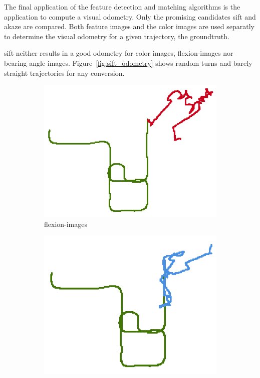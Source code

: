 The final application of the feature detection and matching algorithms is the application to compute a visual odometry. 
Only the promising candidates \acrshort{sift} and \acrshort{akaze} are compared.
Both feature images and the color images are used separatly to determine the visual odometry for a given trajectory, the groundtruth.

\acrshort{sift} neither results in a good odometry for color images, \glspl{flexion-image} nor \glspl{bearing-angle-image}.
Figure~\ref{fig:sift_odometry} shows random turns and barely straight trajectories for any conversion.
\begin{figure}[htp]
\begin{subfigure}[b]{0.31\linewidth}
    \includegraphics[width=\linewidth]{chapter06/odo/jonas_flexion_SIFT_nice.png}%
    \caption{\glspl{flexion-image}}
\end{subfigure}%
\begin{subfigure}[b]{0.31\linewidth}
    \includegraphics[width=\linewidth]{chapter06/odo/jonas_bearing_SIFT_nice.png}%

\end{subfigure}
\end{figure}
